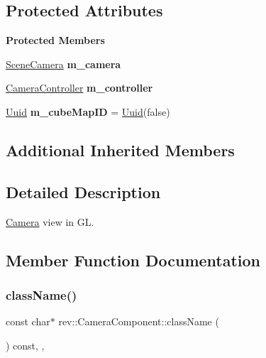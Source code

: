 \subsection*{Protected Attributes}
\begin{Indent}\textbf{ Protected Members}\par
\begin{DoxyCompactItemize}
\item 
\mbox{\label{classrev_1_1_camera_component_a8ef7e22582a8eceb47f30a8e95028170}} 
\mbox{\hyperlink{classrev_1_1_scene_camera}{Scene\+Camera}} {\bfseries m\+\_\+camera}
\item 
\mbox{\label{classrev_1_1_camera_component_a7addff08a97ec31b0704921f0374cae5}} 
\mbox{\hyperlink{classrev_1_1_camera_controller}{Camera\+Controller}} {\bfseries m\+\_\+controller}
\item 
\mbox{\label{classrev_1_1_camera_component_a6518d01b22c07d2d564ce15607cba45c}} 
\mbox{\hyperlink{classrev_1_1_uuid}{Uuid}} {\bfseries m\+\_\+cube\+Map\+ID} = \mbox{\hyperlink{classrev_1_1_uuid}{Uuid}}(false)
\end{DoxyCompactItemize}
\end{Indent}
\subsection*{Additional Inherited Members}


\subsection{Detailed Description}
\mbox{\hyperlink{classrev_1_1_camera}{Camera}} view in GL. 

\subsection{Member Function Documentation}
\mbox{\label{classrev_1_1_camera_component_a3461de347041bf3376283e4f66914d8b}} 
\subsubsection{\texorpdfstring{className()}{className()}}
{\footnotesize\ttfamily const char$\ast$ rev\+::\+Camera\+Component\+::class\+Name (\begin{DoxyParamCaption}{ }\end{DoxyParamCaption}) const\hspace{0.3cm}{\ttfamily [inline]}, {\ttfamily [override]}, {\ttfamily [virtual]}}



